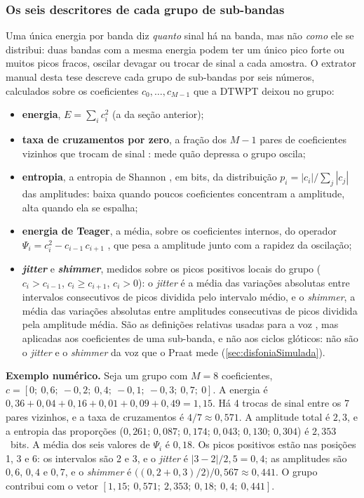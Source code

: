 			\subsubsection{Os seis descritores de cada grupo de sub-bandas}
			\label{sec:descritores}
				\par Uma única energia por banda diz \emph{quanto} sinal há na banda, mas não \emph{como} ele se distribui: duas bandas com a mesma energia podem ter um único pico forte ou muitos picos fracos, oscilar devagar ou trocar de sinal a cada amostra. O extrator manual desta tese descreve cada grupo de sub-bandas por seis números, calculados sobre os coeficientes $c_0, \ldots, c_{M-1}$ que a \ac{DTWPT} deixou no grupo:
				\begin{itemize}
					\item \textbf{energia}, $E = \sum_i c_i^2$ (a da seção anterior);
					\item \textbf{taxa de cruzamentos por zero}, a fração dos $M-1$ pares de coeficientes vizinhos que trocam de sinal \cite{GUIDO2016248}: mede quão depressa o grupo oscila;
					\item \textbf{entropia}, a entropia de Shannon \cite{shannon1948mathematical}, em bits, da distribuição $p_i = |c_i| / \sum_j |c_j|$ das amplitudes: baixa quando poucos coeficientes concentram a amplitude, alta quando ela se espalha;
					\item \textbf{energia de Teager}, a média, sobre os coeficientes internos, do operador $\Psi_i = c_i^2 - c_{i-1}\,c_{i+1}$ \cite{kaiser1990teager}, que pesa a amplitude junto com a rapidez da oscilação;
					\item \textbf{\textit{jitter}} e \textbf{\textit{shimmer}}, medidos sobre os picos positivos locais do grupo ($c_i > c_{i-1}$, $c_i \geq c_{i+1}$, $c_i > 0$): o \textit{jitter} é a média das variações absolutas entre intervalos consecutivos de picos dividida pelo intervalo médio, e o \textit{shimmer}, a média das variações absolutas entre amplitudes consecutivas de picos dividida pela amplitude média. São as definições relativas usadas para a voz \cite{WERTZNER2005}, mas aplicadas aos coeficientes de uma sub-banda, e não aos ciclos glóticos: não são o \textit{jitter} e o \textit{shimmer} da voz que o Praat mede (\autoref{sec:disfoniaSimulada}).
				\end{itemize}

				\par \textbf{Exemplo numérico.} Seja um grupo com $M=8$ coeficientes, $c = [0;\ 0{,}6;\ -0{,}2;\ 0{,}4;\ -0{,}1;\ -0{,}3;\ 0{,}7;\ 0]$. A energia é $0{,}36+0{,}04+0{,}16+0{,}01+0{,}09+0{,}49 = 1{,}15$. Há 4 trocas de sinal entre os 7 pares vizinhos, e a taxa de cruzamentos é $4/7 \approx 0{,}571$. A amplitude total é $2{,}3$, e a entropia das proporções ($0{,}261$; $0{,}087$; $0{,}174$; $0{,}043$; $0{,}130$; $0{,}304$) é $2{,}353$~bits. A média dos seis valores de $\Psi_i$ é $0{,}18$. Os picos positivos estão nas posições 1, 3 e 6: os intervalos são 2 e 3, e o \textit{jitter} é $|3-2| / 2{,}5 = 0{,}4$; as amplitudes são $0{,}6$, $0{,}4$ e $0{,}7$, e o \textit{shimmer} é $\big((0{,}2+0{,}3)/2\big) / 0{,}567 \approx 0{,}441$. O grupo contribui com o vetor $[1{,}15;\ 0{,}571;\ 2{,}353;\ 0{,}18;\ 0{,}4;\ 0{,}441]$.

